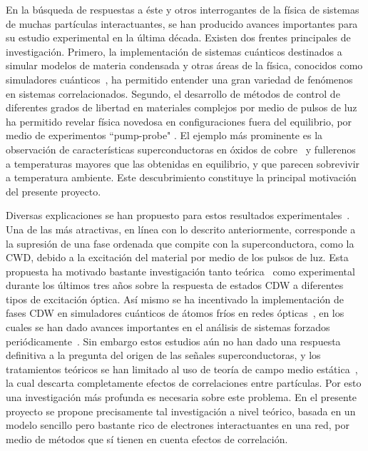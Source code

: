 \documentclass[a4paper,10pt]{article}
\begin{document}
En la b\'usqueda de respuestas a \'este y otros interrogantes de la f\'isica de sistemas de muchas part\'iculas interactuantes, se han producido avances importantes para su estudio experimental en la \'ultima d\'ecada. Existen dos frentes principales de investigaci\'on. Primero, la implementaci\'on de sistemas cu\'anticos destinados a simular modelos de materia condensada y otras \'areas de la f\'isica, conocidos como simuladores cu\'anticos~\cite{georgescu2014rmp}, ha permitido entender una gran variedad de fen\'omenos en sistemas correlacionados. Segundo, el desarrollo de m\'etodos de control de diferentes grados de libertad en materiales complejos por medio de pulsos de luz ha permitido revelar f\'isica novedosa en configuraciones fuera del equilibrio, por medio de experimentos ``pump-probe" \cite{mankowski2016rep}. El ejemplo m\'as prominente es la observaci\'on de caracter\'isticas superconductoras en \'oxidos de cobre~\cite{hu2014nat} y fullerenos~\cite{mitrano2016nat} a temperaturas mayores que las obtenidas en equilibrio, y que parecen sobrevivir a temperatura ambiente. Este descubrimiento constituye la principal motivaci\'on del presente proyecto. 

Diversas explicaciones se han propuesto para estos resultados experimentales~\cite{hu2014nat,bukov2016prl,jonathan2016}. Una de las m\'as atractivas, en l\'inea con lo descrito anteriormente, corresponde a la supresi\'on de una fase ordenada que compite con la superconductora, como la CWD, debido a la excitaci\'on del material por medio de los pulsos de luz. Esta propuesta ha motivado bastante investigaci\'on tanto te\'orica~\cite{sentef2017prl} como experimental~\cite{forst2014prb,singer2016prl,mankowsky2017prl} durante los \'ultimos tres a\~nos sobre la respuesta de estados CDW a diferentes tipos de excitaci\'on \'optica. As\'i mismo se ha incentivado la implementaci\'on de fases CDW en simuladores cu\'anticos de \'atomos fr\'ios en redes \'opticas~\cite{messer2015prl}, en los cuales se han dado avances importantes en el an\'alisis de sistemas forzados peri\'odicamente~\cite{eckardt2017rmp,gorg2017}. Sin embargo estos estudios a\'un no han dado una respuesta definitiva a la pregunta del origen de las se\~nales superconductoras, y los tratamientos te\'oricos se han limitado al uso de teor\'ia de campo medio est\'atica~\cite{sentef2017prl}, la cual descarta completamente efectos de correlaciones entre part\'iculas. Por esto una investigaci\'on m\'as profunda es necesaria sobre este problema. En el presente proyecto se propone precisamente tal investigaci\'on a nivel te\'orico, basada en un modelo sencillo pero bastante rico de electrones interactuantes en una red, por medio de m\'etodos que s\'i tienen en cuenta efectos de correlaci\'on. 
\end{document}
